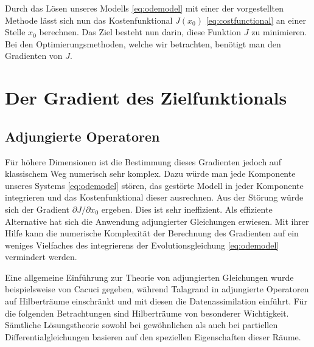 Durch das Lösen unseres Modells \eqref{eq:odemodel} mit einer der vorgestellten Methode lässt sich nun das Kostenfunktional $J(x_0)$ \eqref{eq:costfunctional} an einer Stelle $x_0$ berechnen. Das Ziel besteht nun darin, diese Funktion $J$ zu minimieren.
Bei den Optimierungsmethoden, welche wir betrachten, benötigt man den Gradienten von $J$.

\section{Der Gradient des Zielfunktionals}
\subsection{Adjungierte Operatoren}
Für höhere Dimensionen ist die Bestimmung dieses Gradienten jedoch auf klassischem Weg numerisch sehr komplex. Dazu würde man jede Komponente unseres Systems \eqref{eq:odemodel} stören, das gestörte Modell in jeder Komponente integrieren und das Kostenfunktional dieser ausrechnen. Aus der Störung würde sich der Gradient $\partial J/\partial x_0$ ergeben. Dies ist sehr ineffizient. Als effiziente Alternative hat sich die Anwendung adjungierter Gleichungen erwiesen. Mit ihrer Hilfe kann die numerische Komplexität der Berechnung des Gradienten auf ein weniges Vielfaches des integrierens der Evolutionsgleichung \eqref{eq:odemodel} vermindert werden.

Eine allgemeine Einführung zur Theorie von adjungierten Gleichungen wurde beispielsweise von Cacuci \cite{cacuci1981sensitivity} gegeben, während Talagrand in \cite{talagrand1987variational} adjungierte Operatoren auf Hilberträume einschränkt und mit diesen die Datenassimilation einführt.
Für die folgenden Betrachtungen sind Hilberträume von besonderer Wichtigkeit. Sämtliche Lösungstheorie sowohl bei gewöhnlichen als auch bei partiellen Differentialgleichungen basieren auf den speziellen Eigenschaften dieser Räume.

